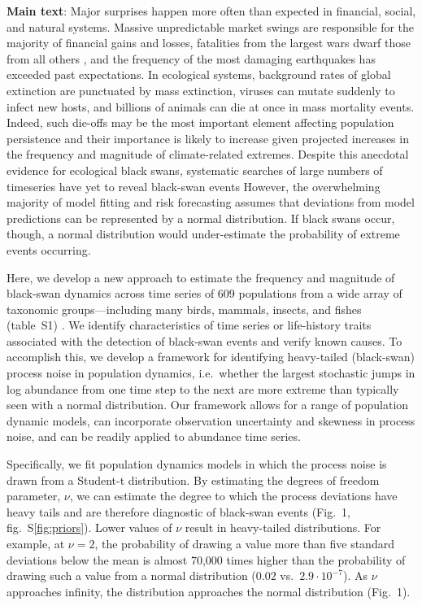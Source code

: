 \textbf{Main text}:
Major surprises happen more often than expected in financial, social, and natural systems\cite{taleb2007, sornette2009, may2008}. Massive unpredictable market swings are responsible for the majority of financial gains and losses\cite{taleb2007}, fatalities from the largest wars dwarf those from all others \cite{newman2005}, and the frequency of the most damaging earthquakes has exceeded past expectations\cite{sornette2009}. In ecological systems, background rates of global extinction are punctuated by mass extinction\cite{harnik2012}, viruses can mutate suddenly to infect new hosts, and billions of animals can die at once in mass mortality events\cite{fey2015}. Indeed, such die-offs may be the most important element affecting population persistence\cite{mangel1994} and their importance is likely to increase given projected increases in the frequency and magnitude of climate-related extremes\cite{ipcc2012}. Despite this anecdotal evidence for ecological black swans, systematic searches of large numbers of timeseries have yet to reveal black-swan events\cite{keitt1998, allen2001, halley2002} However, the overwhelming majority of model fitting and risk forecasting assumes that deviations from model predictions can be represented by a normal distribution\cite{brook2006a, knape2012}. If black swans occur, though, a normal distribution would under-estimate the probability of extreme events occurring.

Here, we develop a new approach to estimate the frequency and magnitude of black-swan dynamics across time series of 609 populations from a wide array of taxonomic groups---including many  birds, mammals, insects, and fishes (table~S1) \cite{SOM}. We identify characteristics of time series or life-history traits associated with the detection of black-swan events and verify known causes. To accomplish this, we develop a framework for identifying heavy-tailed (black-swan) process noise in population dynamics, i.e.~whether the largest stochastic jumps in log abundance from one time step to the next are more extreme than typically seen with a normal distribution. Our framework allows for a range of population dynamic models, can incorporate observation uncertainty and skewness in process noise, and can be readily applied to abundance time series.

Specifically, we fit population dynamics models in which the process noise is drawn from a Student-t distribution. By estimating the degrees of freedom parameter, \(\nu\), we can estimate the degree to which the process deviations have heavy tails and are therefore diagnostic of black-swan events (Fig.~1, fig.~S\ref{fig:priors}). Lower values of \(\nu\) result in heavy-tailed distributions. For example, at \(\nu = 2\), the probability of drawing a value more than five standard deviations below the mean is almost 70,000 times higher than the probability of drawing such a value from a normal distribution (\(0.02\) vs.\ \(2.9\cdot10^{-7}\)). As \(\nu\) approaches infinity, the distribution approaches the normal distribution (Fig.~1).

